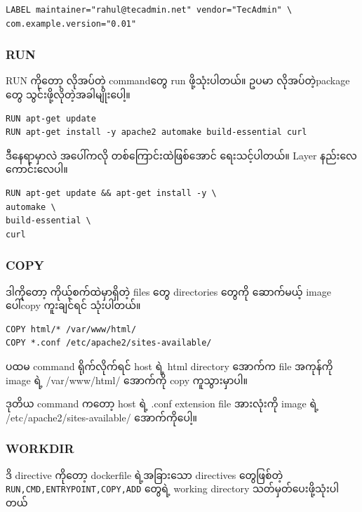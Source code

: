 \begin{verbatim}
LABEL maintainer="rahul@tecadmin.net" vendor="TecAdmin" \
com.example.version="0.01"
\end{verbatim}

\subsubsection{RUN}\label{run}

RUN ကို​တော့ လိုအပ်​တဲ့ command​တွေ run ဖို့သုံးပါတယ်။ ဥပမာ
လိုအပ်တဲ့​package​တွေ သွင်းဖို့လိုတဲ့အခါမျိုး​ပေါ့။

\begin{verbatim}
RUN apt-get update 
RUN apt-get install -y apache2 automake build-essential curl ​​
\end{verbatim}

ဒီ​နေရာမှာလဲ အ​ပေါ်ကလို တစ်​​ကြောင်းထဲဖြစ်​​အောင်​ ​ရေးသင့်ပါတယ်​။ Layer
နည်း​လေ​ကောင်း​လေပါ။

\begin{verbatim}
RUN apt-get update && apt-get install -y \
automake \
build-essential \
curl
\end{verbatim}

\subsubsection{COPY}\label{copy}

ဒါကို​တော့ ကိုယ့်စက်​ထဲမှာရှိတဲ့ files ​တွေ directories ​တွေကို
​ဆောက်​မယ့် image ​ပေါ်copy ကူးချင်​ရင်​ သုံးပါတယ်။​

\begin{verbatim}
COPY html/* /var/www/html/
COPY *.conf /etc/apache2/sites-available/
\end{verbatim}

ပထမ command ရိုက်​လိုက်​ရင်​ host ရဲ့ html directory ​အောက်​က file
အကုန်​ကို image ရဲ့ /var/www/html/ ​အောက်​ကို copy ကူသွားမှာပါ။

ဒုတိယ command က​တော့ host ရဲ့ .conf extension file အားလုံးကို image ရဲ့
/etc/apache2/sites-available/ ​အောက်​ကို​ပေါ့။

\subsubsection{WORKDIR}\label{workdir}

ဒိ directive ကို​တော့ dockerfile ရဲ့အခြား​သော directives ​တွေဖြစ်​တဲ့
\texttt{RUN,CMD,ENTRYPOINT,COPY,ADD} ​တွေရဲ့ working directory
သတ်​မှတ်​​ပေးဖို့သုံးပါတယ်​

